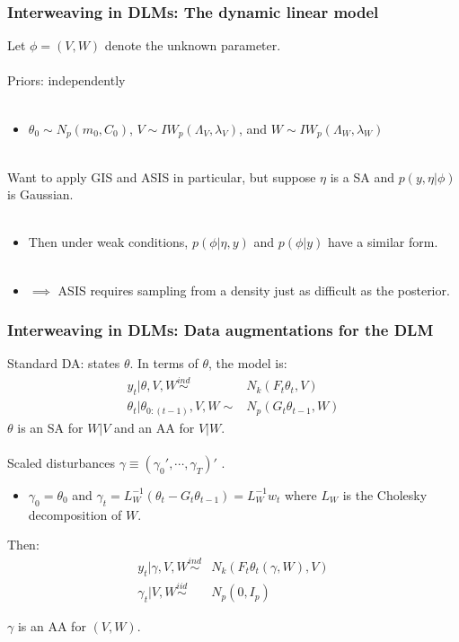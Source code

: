 \documentclass[xcolor=dvipsnames]{beamer}
\begin{document}
\begin{frame}
  \frametitle{Interweaving in DLMs: The dynamic linear model} 
Let $\phi=(V,W)$ denote the unknown parameter.\\~\\

Priors: independently \\~\\
\begin{itemize}
\item[]$\theta_0\sim N_p(m_0,C_0)$, $V\sim IW_p(\Lambda_V,\lambda_V)$, and $W\sim IW_p(\Lambda_W,\lambda_W)$\\~\\
\end{itemize}

\pause Want to apply GIS and ASIS in particular, but suppose $\eta$ is a SA and $p(y,\eta|\phi)$ is Gaussian.\\~
\begin{itemize}
\item[] Then under weak conditions, $p(\phi|\eta,y)$ and $p(\phi|y)$ have a similar form.\\~\\
\pause\item[] $\implies$ ASIS requires sampling from a density just as difficult as the posterior.
\end{itemize}

\end{frame}

\begin{frame}
\frametitle{Interweaving in DLMs: Data augmentations for the DLM}
Standard DA: states $\theta$. In terms of $\theta$, the model is:
\begin{align*}
y_t|\theta,V,W \stackrel{ind}{\sim} & N_k(F_t\theta_t,V)\\ 
\theta_t|\theta_{0:(t-1)},V,W \sim & N_p(G_t\theta_{t-1},W)
\end{align*} 
{\color{blue}$\theta$ is an SA for $W|V$ and an AA for $V|W$.}\\~\\

\pause Scaled disturbances $\gamma\equiv(\gamma_0',\cdots,\gamma_T)'$ \citep{fruhwirth2004efficient}.
\begin{itemize}
\item[]$\gamma_0=\theta_0$ and $\gamma_t=L_W^{-1}(\theta_t - G_t\theta_{t-1})=L_W^{-1}w_t$ where $L_W$ is the Cholesky decomposition of $W$.
\end{itemize}
Then:
\begin{align*}
y_t|\gamma,V,W \stackrel{ind}{\sim} & N_k(F_t\theta_t(\gamma,W),V) \\
\gamma_t|V,W \stackrel{iid}{\sim} & N_p(0,I_p)
\end{align*} 

{\color{blue}$\gamma$ is an AA for $(V,W)$.}

\end{frame}
\end{document}
